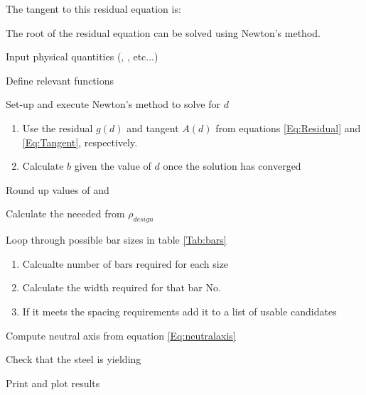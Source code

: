 The tangent to this residual equation is:


The root of the residual equation can be solved using Newton's method.


\vfill
\begin{pseudocode}
	\item Input physical quantities (\fc, \fy, etc...)
	\item Define relevant functions
	\item Set-up and execute Newton's method to solve for $d$

	\begin{enumerate}
	\item Use the residual $g(d)$ and tangent $A(d)$ from equations \ref{Eq:Residual} and \ref{Eq:Tangent}, respectively.
	\item Calculate $b$ given the value of $d$ once the solution has converged
	\end{enumerate}
 
	\item Round up values of \bb and \dd
	\item Calculate the neeeded \As   from $\rho_{design}$
	
	\item Loop through possible bar sizes in table \ref{Tab:bars}

	\begin{enumerate}
		\item Calcualte number of bars required for each size
		\item Calculate the width required for that bar No.
		\item If it meets the spacing requirements add it to a list of usable candidates
	\end{enumerate}

	\item Compute neutral axis from equation \ref{Eq:neutralaxis}
	\item Check that the steel is yielding
	\item Print and plot results
\end{pseudocode}
\hfill